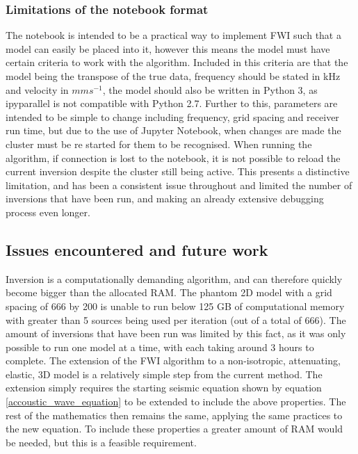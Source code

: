\subsubsection{Limitations of the notebook format}
The notebook is intended to be a practical way to implement FWI such that a model can easily be placed into it, however this means the model must have certain criteria to work with the algorithm. Included in this criteria are that the model being the transpose of the true data, frequency should be stated in kHz and velocity in $mms^{-1}$, the model should also be written in Python 3, as ipyparallel is not compatible with Python 2.7. 
Further to this, parameters are intended to be simple to change including frequency, grid spacing and receiver run time, but due to the use of Jupyter Notebook, when changes are made the cluster must be re started for them to be recognised. 
When running the algorithm, if connection is lost to the notebook, it is not possible to reload the current inversion despite the cluster still being active. This presents a distinctive limitation, and has been a consistent issue throughout and limited the number of inversions that have been run, and making an already extensive debugging process even longer. 

\subsection{Issues encountered and future work}
Inversion is a computationally demanding algorithm, and can therefore quickly become bigger than the allocated RAM. The phantom 2D model with a grid spacing of 666 by 200 is unable to run below 125 GB of computational memory with greater than 5 sources being used per iteration (out of a total of 666). The amount of inversions that have been run was limited by this fact, as it was only possible to run one model at a time, with each taking around 3 hours to complete. 
The extension of the FWI algorithm to a non-isotropic, attenuating, elastic, 3D model is a relatively simple step from the current method. The extension simply requires the starting seismic equation shown by equation \ref{accoustic_wave_equation} to be extended to include the above properties. The rest of the mathematics then remains the same, applying the same practices to the new equation. To include these properties a greater amount of RAM would be needed, but this is a feasible requirement. 

